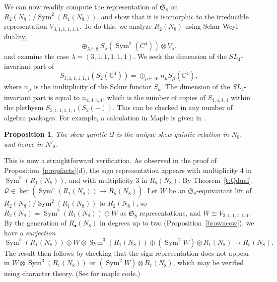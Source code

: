 \documentclass{amsart}
\newtheorem{proposition}[theorem]{Proposition}
\theoremstyle{definition}
\theoremstyle{remark}
\DeclareMathOperator{\Sym}{Sym}
\def\SS{\mathfrak{S}}
\def\C{\mathbb{C}}
\def\quintic{\mathcal{Q}}
\begin{document}
We can now readily compute the representation of $\SS_8$ on $R_2(N_8) /
\Sym^2(R_1(N_8))$, and show that it is isomorphic to the irreducible
representation $V_{3,1,1,1,1,1}$.  To do this, we analyze $R_2(N_8)$
using  Schur-Weyl duality,
$$\oplus_{\lambda \vdash 8} S_\lambda( \Sym^2(C^4)) \otimes V_\lambda,$$ 
and examine  the case $\lambda = (3,1,1,1,1,1)$.
We seek the dimension of the $SL_4$-invariant part of 
$$S_{3,1,1,1,1,1}(S_{2}(\C^4)) = \oplus_{\mu \vdash 16} n_\mu S_\mu(\C^4),$$ 
where $n_\mu$ is the multiplicity of the Schur functor $S_\mu$.  
The dimension of the $SL_4$-invariant part is equal to $n_{4,4,4,4}$, 
which is the number of copies of $S_{4,4,4,4}$ within the plethysm 
$S_{3,1,1,1,1,1}(S_{2}( - ))$.  This can be checked in any number of
algebra packages.  For example,  a calculation in  Maple  is given in
\cite{hmsvcode}.

\begin{proposition}
The skew quintic $\quintic$ is the unique skew quintic relation in
$N_8$, and hence in $N'_8$.\label{uniqueskewquintic}
\end{proposition}

This is now a straightforward verification.  As observed in the proof
of Proposition~\ref{p:repfacts}(d), the sign representation appears
with multiplicity $4$ in $\Sym^5(R_1(N_8))$, and with multiplicity $3$
in $R_5(N_8)$. 
By Theorem~\ref{t:Qdual}, $\quintic \in \ker( \Sym^5(R_1(N_8)) \rightarrow
R_5(N_8))$.
Let $W$ be an $\SS_8$-equivariant lift of $R_2(N_8) /
\Sym^2(R_1(N_8))$ to $R_2(N_8)$, so $R_2(N_8) = \Sym^2(R_1(N_8))
\oplus W$ as $\SS_8$ representations, and $W \cong V_{3,1,1,1,1,1}$.
By the generation of $R_{\bullet}(N_8)$  in degrees up to two
(Proposition~\ref{browncow}), we have a {\em surjection}
$$
\Sym^5(R_1(N_8)) \oplus W \otimes \Sym^3 (R_1(N_8)) \oplus \left(
  \Sym^2 W \right)
\otimes R_1(N_8) \rightarrow R_5(N_8).$$
The result then follows by checking that the sign representation does
not appear in 
$W \otimes \Sym^3 (R_1(N_8))$ or $(  \Sym^2 W )
\otimes R_1(N_8)$, which may be verified using character theory.
(See \cite{hmsvcode} for maple code.)
\end{document}
